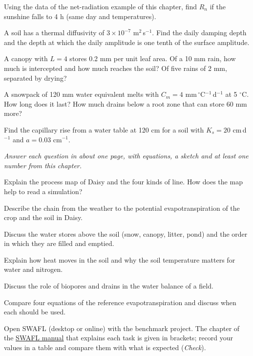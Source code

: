\begin{exlist}
\item Using the data of the net-radiation example of this chapter, find $R_n$ if the sunshine falls to 4 h (same day and temperatures).
\item A soil has a thermal diffusivity of $3\times10^{-7}$ m$^2$\,s$^{-1}$. Find the daily damping depth and the depth at which the daily amplitude is one tenth of the surface amplitude.
\item A canopy with $L=4$ stores 0.2 mm per unit leaf area. Of a 10 mm rain, how much is intercepted and how much reaches the soil? Of five rains of 2 mm, separated by drying?
\item A snowpack of 120 mm water equivalent melts with $C_m=4$ mm\,$^\circ$C$^{-1}$\,d$^{-1}$ at 5 $^\circ$C. How long does it last? How much drains below a root zone that can store 60 mm more?
\item Find the capillary rise from a water table at 120 cm for a soil with $K_s=20$ cm\,d$^{-1}$ and $a=0.03$ cm$^{-1}$.
\end{exlist}
{\small\itshape Answer each question in about one page, with equations, a sketch and at least one number from this chapter.}\par\vspace{3pt}
\begin{exlist}
\item Explain the process map of Daisy and the four kinds of line. How does the map help to read a simulation?
\item Describe the chain from the weather to the potential evapotranspiration of the crop and the soil in Daisy.
\item Discuss the water stores above the soil (snow, canopy, litter, pond) and the order in which they are filled and emptied.
\item Explain how heat moves in the soil and why the soil temperature matters for water and nitrogen.
\item Discuss the role of biopores and drains in the water balance of a field.
\item Compare four equations of the reference evapotranspiration and discuss when each should be used.
\end{exlist}
{\small Open SWAFL (desktop or online) with the benchmark project. The chapter of the \href{https://github.com/halilunaziru73-creator/Coupled-Water-Fluxes-Pore-Scale-Dynamics-Precision-Irrigation-Mulching-Feedback-Loops/raw/main/Software/v1.1.0/SWAFL_Desktop/docs/manual_v1.1.0/SWAFL_Manual_v1.1.0.pdf}{SWAFL manual} that explains each task is given in brackets; record your values in a table and compare them with what is expected (\emph{Check}).}\par\vspace{3pt}
